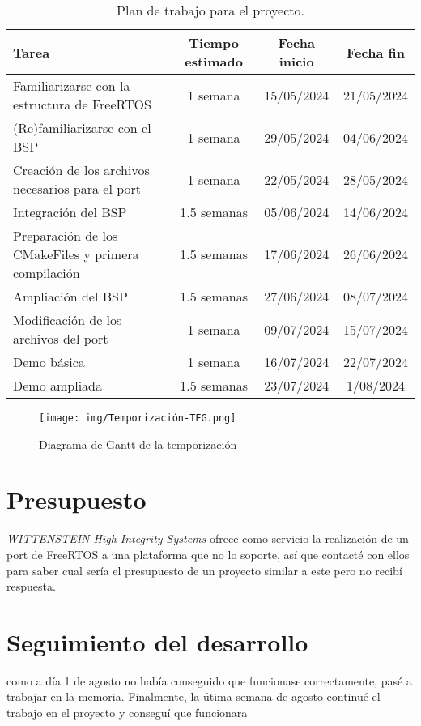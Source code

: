\begin{table}[h!]
\centering
\begin{tabularx}{\textwidth}{|X|c|c|c|}
\hline
\textbf{Tarea} & \textbf{Tiempo estimado} & \textbf{Fecha inicio} & \textbf{Fecha fin} \\ \hline
Familiarizarse con la estructura de FreeRTOS & 1 semana & 15/05/2024 & 21/05/2024 \\ \hline
(Re)familiarizarse con el BSP & 1 semana & 29/05/2024 & 04/06/2024 \\ \hline
Creación de los archivos necesarios para el port & 1 semana & 22/05/2024 & 28/05/2024 \\ \hline
Integración del BSP & 1.5 semanas & 05/06/2024 & 14/06/2024 \\ \hline
Preparación de los CMakeFiles y primera compilación & 1.5 semanas & 17/06/2024 & 26/06/2024 \\ \hline
Ampliación del BSP & 1.5 semanas & 27/06/2024 & 08/07/2024 \\ \hline
Modificación de los archivos del port & 1 semana & 09/07/2024 & 15/07/2024 \\ \hline
Demo básica & 1 semana & 16/07/2024 & 22/07/2024 \\ \hline
Demo ampliada & 1.5 semanas & 23/07/2024 & 1/08/2024 \\ \hline
\end{tabularx}
\caption{Plan de trabajo para el proyecto.}
\label{tabla:plan_trabajo}
\end{table}

\begin{figure}[h]
\centering
\texttt{[image: img/Temporización-TFG.png]}
\caption{Diagrama de Gantt de la temporización}
\label{fig:Gantt_1}
\end{figure}

\section{Presupuesto}
\emph{WITTENSTEIN High Integrity Systems} ofrece como servicio la realización de un port de FreeRTOS a una plataforma que no lo soporte, así que contacté con ellos para saber cual sería el presupuesto de un proyecto similar a este pero no recibí respuesta.

\section{Seguimiento del desarrollo}

como a día 1 de agosto no había conseguido que funcionase correctamente, pasé a trabajar en la memoria. Finalmente, la útima semana de agosto continué el trabajo en el proyecto y conseguí que funcionara
